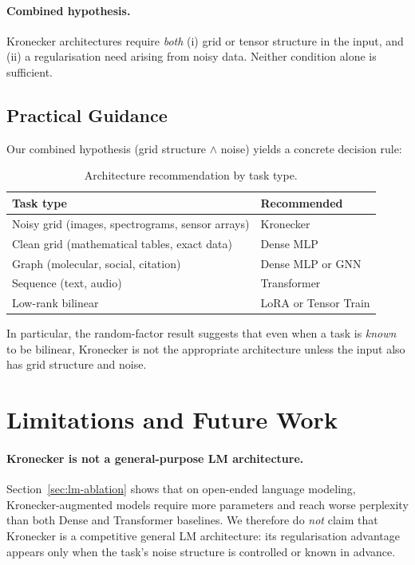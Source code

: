 \documentclass[11pt,a4paper]{article}
\begin{document}
\paragraph{Combined hypothesis.}
Kronecker architectures require \emph{both} (i) grid or tensor
structure in the input, and (ii) a regularisation need arising
from noisy data. Neither condition alone is sufficient.


\subsection{Practical Guidance}

Our combined hypothesis (grid structure $\land$ noise) yields a
concrete decision rule:

\begin{table}[h]
\centering
\caption{Architecture recommendation by task type.}
\label{tab:guide}
\small
\begin{tabular}{ll}
\toprule
Task type & Recommended \\
\midrule
Noisy grid (images, spectrograms, sensor arrays) & Kronecker \\
Clean grid (mathematical tables, exact data)     & Dense MLP \\
Graph (molecular, social, citation)              & Dense MLP or GNN \\
Sequence (text, audio)                           & Transformer \\
Low-rank bilinear                                & LoRA or Tensor Train \\
\bottomrule
\end{tabular}
\end{table}

In particular, the random-factor result suggests that even when a
task is \emph{known} to be bilinear, Kronecker is not the
appropriate architecture unless the input also has grid structure
and noise.

\section{Limitations and Future Work}
\label{sec:limitations}

\paragraph{Kronecker is not a general-purpose LM architecture.}
Section~\ref{sec:lm-ablation} shows that on open-ended language
modeling, Kronecker-augmented models require more parameters and
reach worse perplexity than both Dense and Transformer baselines.
We therefore do \emph{not} claim that Kronecker is a competitive
general LM architecture: its regularisation advantage appears only
when the task's noise structure is controlled or known in advance.
\end{document}
